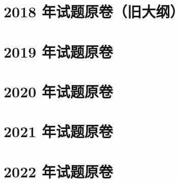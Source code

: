 \chapter{2018 年试题原卷（旧大纲）}

\chapter{2019 年试题原卷}

\chapter{2020 年试题原卷}

\chapter{2021 年试题原卷}

\chapter{2022 年试题原卷}
